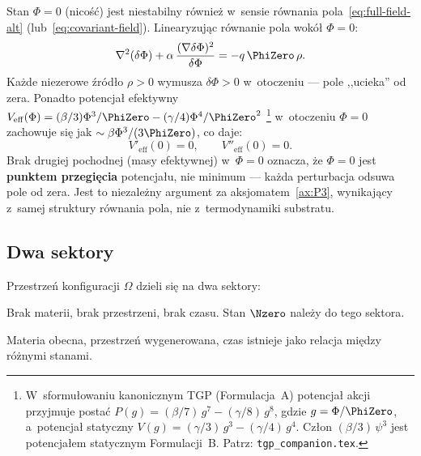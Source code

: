 \begin{proposition}\label{prop:P3-action}
Stan $\Phi = 0$ (nicość) jest niestabilny r\'ownie\.z
w~sensie r\'ownania pola~\eqref{eq:full-field-alt}
(lub~\eqref{eq:covariant-field}). Linearyzuj\k{a}c
r\'ownanie pola wok\'o\l{} $\Phi = 0$:
\begin{equation}\label{eq:P3-lin}
    \nabla^2(\delta\Phi) + \alpha\,\frac{(\nabla\delta\Phi)^2}
    {\delta\Phi} = -q\,\PhiZero\,\rho.
\end{equation}
Ka\.zde niezerowe \'zr\'od\l{}o $\rho > 0$ wymusza
$\delta\Phi > 0$ w~otoczeniu --- pole ,,ucieka'' od zera.
Ponadto potencja\l{} efektywny
$V_{\mathrm{eff}}(\Phi) = (\beta/3)\Phi^3/\PhiZero
- (\gamma/4)\Phi^4/\PhiZero^2$%
\footnote{W~sformu\l{}owaniu kanonicznym TGP (Formulacja~A) potencja\l{} akcji
przyjmuje posta\'c $P(g) = (\beta/7)\,g^7 - (\gamma/8)\,g^8$, gdzie $g = \Phi/\PhiZero$,
a~potencja\l{} statyczny $V(g) = (\gamma/3)\,g^3 - (\gamma/4)\,g^4$.
Cz\l{}on $(\beta/3)\,\psi^3$ jest potencja\l{}em statycznym Formulacji~B.
Patrz: \texttt{tgp\_companion.tex}.}
w~otoczeniu $\Phi = 0$
zachowuje si\k{e} jak $\sim\beta\Phi^3/(3\PhiZero)$, co daje:
\begin{equation}
    V'_{\mathrm{eff}}(0) = 0, \qquad
    V''_{\mathrm{eff}}(0) = 0.
\end{equation}
Brak drugiej pochodnej (masy efektywnej) w~$\Phi = 0$
oznacza, \.ze $\Phi = 0$ jest \textbf{punktem przegi\k{e}cia}
potencja\l{}u, nie minimum --- ka\.zda perturbacja
odsuwa pole od zera. Jest to niezale\.zny argument za
aksjomatem~\ref{ax:P3}, wynikaj\k{a}cy z~samej
struktury r\'ownania pola, nie z~termodynamiki substratu.
\end{proposition}

\subsection{Dwa sektory}\label{ssec:sektory}

\begin{definition}\label{def:sektory}
Przestrze\'n konfiguracji $\Omega$ dzieli si\k{e} na dwa sektory:
\begin{description}[style=nextline,nosep]
  \item[{$\mathcal{S}_0 = \{\sigma : \Ffield[\sigma] = 0\}$
    --- sektor nico\'sci}]
    Brak materii, brak przestrzeni, brak czasu.
    Stan $\Nzero$ nale\.zy do tego sektora.
  \item[{$\mathcal{S}_1 = \{\sigma : \Ffield[\sigma] > 0\}$
    --- sektor istnienia}]
    Materia obecna, przestrze\'n wygenerowana, czas istnieje
    jako relacja mi\k{e}dzy r\'o\.znymi stanami.
\end{description}
\end{definition}


